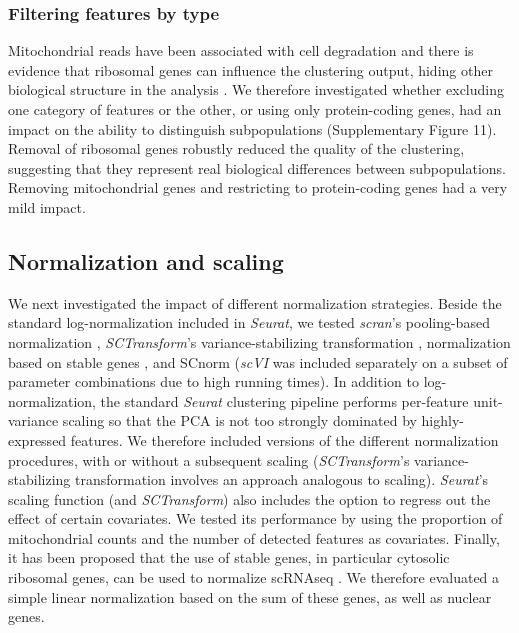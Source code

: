 \documentclass{bmcart}
\begin{document}
\subsubsection*{Filtering features by type}

Mitochondrial reads have been associated with cell degradation and there is evidence that ribosomal genes can influence the clustering output, hiding other biological structure in the analysis \cite{freytagComparison2018}. We therefore investigated whether excluding one category of features or the other, or using only protein-coding genes, had an impact on the ability to distinguish subpopulations (Supplementary Figure 11). Removal of ribosomal genes robustly reduced the quality of the clustering, suggesting that they represent real biological differences between subpopulations. Removing mitochondrial genes and restricting to protein-coding genes had a very mild impact.

\subsection*{Normalization and scaling}

We next investigated the impact of different normalization strategies. Beside the standard log-normalization included in \textit{Seurat}, we tested \textit{scran}'s pooling-based normalization \cite{lunPooling2016}, \textit{SCTransform}'s variance-stabilizing transformation \cite{hafemeisterSCtransform2019}, normalization based on stable genes \cite{linStableGenes2018, deekeStablyExpressed2018}, and SCnorm \cite{bacherSCnorm2017} (\textit{scVI} \cite{lopezDeep2018} was included separately on a subset of parameter combinations due to high running times). In addition to log-normalization, the standard \textit{Seurat} clustering pipeline performs per-feature unit-variance scaling so that the PCA is not too strongly dominated by highly-expressed features. We therefore included versions of the different normalization procedures, with or without a subsequent scaling (\textit{SCTransform}'s variance-stabilizing transformation involves an approach analogous to scaling). 
\textit{Seurat}'s scaling function (and \textit{SCTransform}) also includes the option to regress out the effect of certain covariates. We tested its performance by using the proportion of mitochondrial counts and the number of detected features as covariates. Finally, it has been proposed that the use of stable genes, in particular cytosolic ribosomal genes, can be used to normalize scRNAseq \cite{deekeStablyExpressed2018}. We therefore evaluated a simple linear normalization based on the sum of these genes, as well as nuclear genes.
\end{document}
